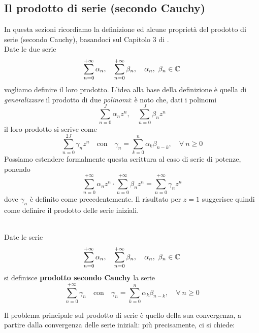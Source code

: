 \subsection{Il prodotto di serie (secondo Cauchy)}\label{prodottosecondocauchy}
In questa sezioni ricordiamo la definizione ed alcune proprietà del prodotto di serie (secondo Cauchy), basandoci sul Capitolo 3 di \cite{rudin:1976principles}.\\
Date le due serie
\begin{equation*}
	\sum_{n=0}^{+\infty} \alpha_n,\quad \sum_{n=0}^{+\infty} \beta_n,\quad \alpha_n, \ \beta_n \in \mathbb{C}
\end{equation*}
vogliamo definire il loro prodotto. L'idea alla base della definizione è quella di \textit{generalizzare} il prodotto di due \textit{polinomi}: è noto che, dati i polinomi 
\begin{equation*}
	\sum_{n=0}^{J} \alpha_n z^n,\quad \sum_{n=0}^{J} \beta_n z^n
\end{equation*}
il loro prodotto si scrive come
\begin{equation*}
	\sum_{n=0}^{2J} \gamma_n z^n\quad\text{con}\quad\gamma_n= \sum_{k=0}^{n} \alpha_k\beta_{n-k},\quad \forall \ n\geq 0
\end{equation*}
Possiamo estendere formalmente questa scrittura al caso di serie di potenze, ponendo
\begin{equation*}
	\sum_{n=0}^{+\infty} \alpha_n z^n \cdot \sum_{n=0}^{+\infty} \beta_n z^n = \sum_{n=0}^{+\infty} \gamma_n z^n
\end{equation*}
dove $\gamma_n$ è definito come precedentemente. Il risultato per $z=1$ suggerisce quindi come definire il prodotto delle serie iniziali.
\begin{define}~{}\\
	Date le serie
	\begin{equation*}
		\sum_{n=0}^{+\infty} \alpha_n,\quad \sum_{n=0}^{+\infty} \beta_n,\quad \alpha_n, \ \beta_n \in \mathbb{C}
	\end{equation*}
si definisce \textbf{prodotto secondo Cauchy} la serie
\begin{equation*}
	\sum_{n=0}^{+\infty} \gamma_n\quad\text{con}\quad\gamma_n= \sum_{k=0}^{n} \alpha_k\beta_{n-k},\quad \forall \ n\geq 0
\end{equation*}
\end{define}
Il problema principale sul prodotto di serie è quello della sua convergenza, a partire dalla convergenza delle serie iniziali: più precisamente, ci si chiede:

